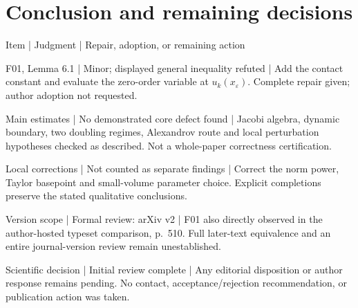 \documentclass[10pt]{article}
\begin{document}
\section*{Conclusion and remaining decisions}
Item | Judgment | Repair, adoption, or remaining action\par
F01, Lemma 6.1 | Minor; displayed general inequality refuted | Add the contact constant and evaluate the zero-order variable at \(u_k(x_\varepsilon)\). Complete repair given; author adoption not requested.\par
Main estimates | No demonstrated core defect found | Jacobi algebra, dynamic boundary, two doubling regimes, Alexandrov route and local perturbation hypotheses checked as described. Not a whole-paper correctness certification.\par
Local corrections | Not counted as separate findings | Correct the norm power, Taylor basepoint and small-volume parameter choice. Explicit completions preserve the stated qualitative conclusions.\par
Version scope | Formal review: arXiv v2 | F01 also directly observed in the author-hosted typeset comparison, p. 510. Full later-text equivalence and an entire journal-version review remain unestablished.\par
Scientific decision | Initial review complete | Any editorial disposition or author response remains pending. No contact, acceptance/rejection recommendation, or publication action was taken.\par
\end{document}
